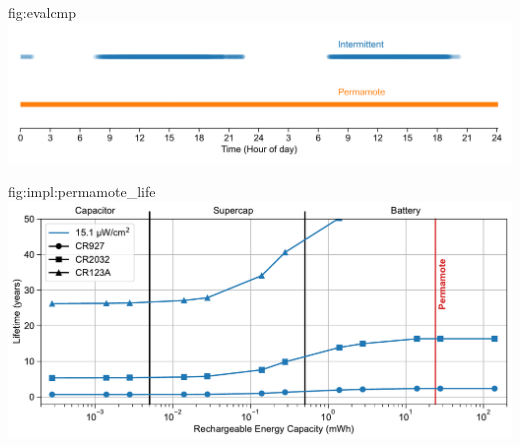 \begin{definefigure}{fig:evalcmp}
    \centering
    \includegraphics[width=\linewidth]{figs/capacity/experiment_sys_compare/exp_packets_recv}
    \caption{
      \normalfont
        Packets received over two days.
      This figure compares the availability of an
      batteryless design and \name. \name sends a packet every second and does
      so without fail, while the batteryless system is only able to send when
      light is available.
      }
\end{definefigure}

\begin{definefigure}{fig:impl:permamote_life}
    \centering
    \includegraphics[width=\linewidth]{figs/capacity/primary/sense_and_send_life_vs_sec_size_permamote.pdf}
    \caption{
        Lifetime estimation of the \name sense and send workload given different rechargeable buffer sizes and different primary cell sizes. This figure utilizes the low irradiance Setup A environment and the 30 second sense and send workload period.
      This is a different presentation of \cref{fig:capacity:primary} that identifies the rechargeable capacity of \name with a red vertical line.
      }
    
\end{definefigure}

